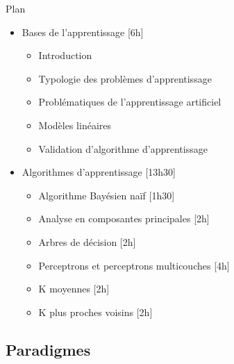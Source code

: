 \documentclass[10pt]{beamer}  %
\begin{document}
\begin{frame}{Plan}
	\begin{itemize}
		\item Bases de l'apprentissage [6h]
		\begin{itemize}
			\item Introduction
			\item Typologie des problèmes d'apprentissage
			\item Problématiques de l'apprentissage artificiel
			\item Modèles linéaires
			\item Validation d'algorithme d'apprentissage
		\end{itemize}
		\item Algorithmes d'apprentissage [13h30]
		\begin{itemize}
			\item Algorithme Bayésien naïf [1h30]
			\item Analyse en composantes principales [2h]
			\item Arbres de décision [2h]
			\item Perceptrons et perceptrons multicouches [4h]
			\item K moyennes [2h]
			\item K plus proches voisins [2h]
		\end{itemize}
	\end{itemize}
\end{frame}

\subsection[Paradigmes]{Paradigmes}
\end{document}

